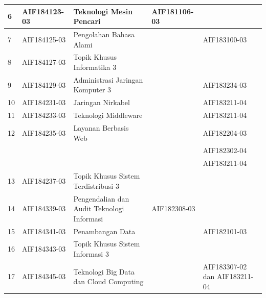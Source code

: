 \begin{table}[H]
\begin{tabular}{|p{0.5cm}|p{2.85cm}|p{4.95cm}|p{2.7cm}|p{2.7cm}|}
6 & AIF184123-03 & Teknologi Mesin Pencari & AIF181106-03 &  \\ \hline
7 & AIF184125-03 & Pengolahan Bahasa Alami &  & AIF183100-03 \\ \hline
8 & AIF184127-03 & Topik Khusus Informatika 3 &  &  \\ \hline
9 & AIF184129-03 & Administrasi Jaringan Komputer 3 &  & AIF183234-03 \\ \hline
10 & AIF184231-03 & Jaringan Nirkabel &  & AIF183211-04 \\ \hline
11 & AIF184233-03 & Teknologi Middleware &  & AIF183211-04 \\ \hline
12 & AIF184235-03 & Layanan Berbasis Web &  & AIF182204-03 \\
 &  &  &  & AIF182302-04 \\
 &  &  &  & AIF183211-04 \\ \hline
13 & AIF184237-03 & Topik Khusus Sistem Terdistribusi 3 &  &  \\ \hline
14 & AIF184339-03 & Pengendalian dan Audit Teknologi Informasi & AIF182308-03 &  \\ \hline
15 & AIF184341-03 & Penambangan Data &  & AIF182101-03 \\ \hline
16 & AIF184343-03 & Topik Khusus Sistem Informasi 3 &  &  \\ \hline
17 & AIF184345-03 & Teknologi Big Data dan Cloud Computing &  & AIF183307-02 dan AIF183211-04 \\ \hline
		\end{tabular}
	\label{tab:DaftarMataKuliahWajibDanPrasyaratnya2}
\end{table}

